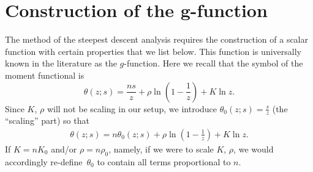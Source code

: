 \documentclass[pdftex]{sigma}
\numberwithin{equation}{section}
\theoremstyle{definition}
\def\le{\left}
\def\ri{\right}
\begin{document}
\section[Construction of the $g$-function]{Construction of the $\boldsymbol{g}$-function} \label{secgfunction}

 The method of the steepest descent analysis requires the construction of a scalar function with certain properties that we list below. This function is universally known in the literature as the $g$-function.
Here we recall that the symbol of the moment functional is
 \[
 \theta(z;s) = \frac {ns}z + { {\rho}} \ln \le(1-\frac 1 z \ri) + { {K}} \ln z.
 \]
 Since ${ {K}}$, ${ {\rho}}$ will not be scaling in our setup, we introduce $\theta_0(z;s) = \frac s z$ (the ``scaling'' part) so that
 \begin{gather}
 \label{42}
\theta(z;s) = n\theta_0(z;s)+ { {\rho}} \ln \le(1-\frac 1 z \ri) + { {K}} \ln z.
 \end{gather}
 If ${ {K}} = n{ {K}}_0$ and/or ${ {\rho}} = n{ {\rho}}_0$, namely, if we were to scale ${ {K}}$, ${ {\rho}}$, we would accordingly re-define~$\theta_0$ to contain all terms proportional to $n$.
\end{document}
